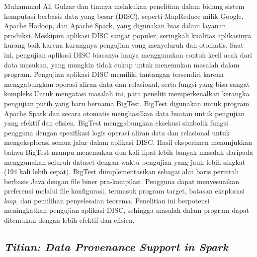 Muhammad Ali Gulzar dan timnya melakukan penelitian dalam bidang sistem komputasi berbasis data yang besar (DISC), seperti MapReduce milik Google, Apache Hadoop, dan Apache Spark, yang digunakan luas dalam layanan produksi. Meskipun aplikasi DISC sangat populer, seringkali kualitas aplikasinya kurang baik karena kurangnya pengujian yang menyeluruh dan otomatis. Saat ini, pengujian aplikasi DISC biasanya hanya menggunakan contoh kecil acak dari data masukan, yang mungkin tidak cukup untuk menemukan masalah dalam program. Pengujian aplikasi DISC memiliki tantangan tersendiri karena menggabungkan operasi aliran data dan relasional, serta fungsi yang bisa sangat kompleks.Untuk mengatasi masalah ini, para peneliti memperkenalkan kerangka pengujian putih yang baru bernama BigTest. BigTest digunakan untuk program Apache Spark dan secara otomatis menghasilkan data buatan untuk pengujian yang efektif dan efisien. BigTest menggabungkan eksekusi simbolik fungsi pengguna dengan spesifikasi logis operasi aliran data dan relasional untuk mengeksplorasi semua jalur dalam aplikasi DISC. Hasil eksperimen menunjukkan bahwa BigTest mampu menemukan dua kali lipat lebih banyak masalah daripada menggunakan seluruh dataset dengan waktu pengujian yang jauh lebih singkat (194 kali lebih cepat). BigTest diimplementasikan sebagai alat baris perintah berbasis Java dengan file biner pra-kompilasi. Pengguna dapat menyesuaikan preferensi melalui file konfigurasi, termasuk program target, batasan eksplorasi \emph{loop}, dan pemilihan penyelesaian teorema. Penelitian ini berpotensi meningkatkan pengujian aplikasi DISC, sehingga masalah dalam program dapat ditemukan dengan lebih efektif dan efisien.

\subsection{\emph{Titian: Data Provenance Support in Spark}}
\label{subsec:Titian: Data Provenance Support in Spark}

